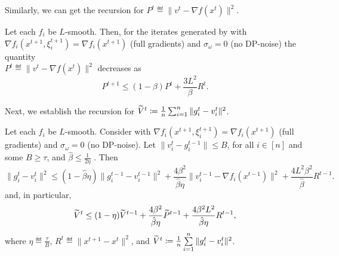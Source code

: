 \documentclass[a4paper,11pt]{article}
\begin{document}
Similarly, we can get the recursion for $P^t\eqdef \|v^t - \nabla f(x^t)\|^2$.
\begin{lemma}\label{lem:descent_Pt}
    Let each $f_i$ be $L$-smooth. Then, for the iterates generated by  with $\nabla f_i(x^{t+1},\xi^{t+1}_i) = \nabla f_i(x^{t+1})$ (full gradients) and $\sigma_{\omega} = 0$ (no DP-noise) the quantity \\ $P^t \eqdef \|v^t - \nabla f(x^t)\|^2$ decreases as 
    \begin{equation}
    P^{t+1} \le (1-\beta)P^t + \frac{3L^2}{\beta}R^t.
    \end{equation}
\end{lemma}
Next, we establish the recursion for $\widetilde{V}^t \coloneqq \frac{1}{n}\sum_{i=1}^n\|g_i^{t} - v_i^{t}\|^2$.
\begin{lemma}\label{lem:descent_Vt_tilde}
    Let each $f_i$ be $L$-smooth. Consider  with $\nabla f_i(x^{t+1},\xi^{t+1}_i) = \nabla f_i(x^{t+1})$ (full gradients) and $\sigma_{\omega} = 0$ (no DP-noise). Let $\|v_i^{t} - g_i^{t-1}\| \le B$, for all $i\in[n]$ and some $B \geq \tau$, and  $\hat{\beta} \le \frac{1}{2\eta}$ . Then
    \[
    \|g_i^{t} - v_i^{t}\|^2 \le (1-\hat{\beta}\eta)\|g_i^{t-1} - v_i^{t-1}\|^2
        + \frac{4\beta^2}{\hat{\beta}\eta}\|v_i^{t-1} - \nabla f_i(x^{t-1})\|^2
        + \frac{4L^2\beta^2}{\hat{\beta}}R^{t-1}.
    \]
    and, in particular,
    \begin{equation*}
         \widetilde{V}^t \le (1-\eta)\widetilde{V}^{t-1} 
    + \frac{4\beta^2}{\hat{\beta}\eta}\widetilde{P}^{t-1} 
    + \frac{4\beta^2L^2}{\hat{\beta}\eta}R^{t-1},
    \end{equation*}
    where $\eta\eqdef \frac{\tau}{B}$, $R^t \eqdef \|x^{t+1} - x^t\|^2$, and $\widetilde{V}^t \coloneqq \frac{1}{n}\sum\limits_{i=1}^n\|g_i^{t} - v_i^{t}\|^2$.
\end{lemma}
\end{document}
